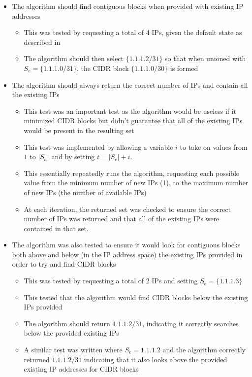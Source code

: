 \begin{itemize}
\item{The algorithm should find contiguous blocks when provided with existing IP addresses}
      \begin{itemize}
      \item{This was tested by requesting a total of 4 IPs, given the default state as described in }
      \item{The algorithm should then select $\{1.1.1.2/31\}$} so that when unioned with $S_e = \{1.1.1.0/31\}$, the CIDR block $\{1.1.1.0/30\}$  is formed 
      \end{itemize}
\item{The algorithm should always return the correct number of IPs and contain all the existing IPs}
      \begin{itemize}
      \item{This test was an important test as the algorithm would be useless if it minimized CIDR blocks but didn't guarantee that all of the existing IPs would be present in the resulting set}
      \item{This test was implemented by allowing a variable $i$ to take on values from $1$ to $|S_a|$ and by setting $t = |S_e| + i$.}
      \item{This essentially repeatedly runs the algorithm, requesting each possible value from the minimum number of new IPs (1), to the maximum number of new IPs (the number of available IPs)}
      \item{At each iteration, the returned set was checked to ensure the correct number of IPs was returned and that all of the existing IPs were contained in that set.}
      \end{itemize}
\item{The algorithm was also tested to ensure it would look for contiguous blocks both above and below (in the IP address space) the existing IPs provided in order to try and find CIDR blocks}
      \begin{itemize}
      \item{This was tested by requesting a total of 2 IPs and setting $S_e = \{1.1.1.3\}$}
      \item{This tested that the algorithm would find CIDR blocks below the existing IPs provided}
      \item{The algorithm should return $1.1.1.2/31$, indicating it correctly searches below the provided existing IPs}
      \item{A similar test was written where $S_e = {1.1.1.2}$ and the algorithm correctly returned $1.1.1.2/31$ indicating that it also looks above the provided existing IP addresses for CIDR blocks}

\end{itemize}
\end{itemize}
